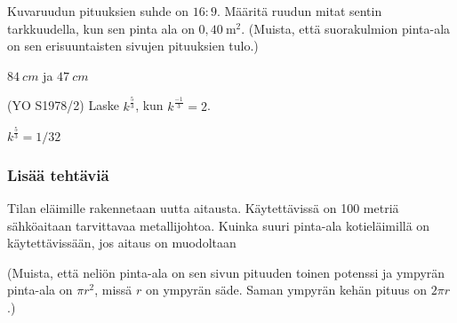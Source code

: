 \begin{tehtavasivu}
\begin{tehtava}
Kuvaruudun pituuksien suhde on $16:9$. Määritä ruudun mitat sentin tarkkuudella, kun sen pinta ala on \(0,40\ \mathrm{m}^2\). (Muista, että suorakulmion pinta-ala on sen erisuuntaisten sivujen pituuksien tulo.)
\begin{vastaus}
$84\ cm$ ja $47\ cm$
\end{vastaus}
\end{tehtava}

\begin{tehtava}
(YO S1978/2) Laske $k^\frac{5}{3}$, kun $k^\frac{-1}{3}=2$. \\
	\begin{vastaus}
		$k^\frac{5}{3}=1/32$
	\end{vastaus}
\end{tehtava}

\subsubsection*{Lisää tehtäviä}

\begin{tehtava}%
Tilan eläimille rakennetaan uutta aitausta. Käytettävissä on 100 metriä sähköaitaan tarvittavaa metallijohtoa. Kuinka suuri pinta-ala kotieläimillä on käytettävissään, jos aitaus on muodoltaan
\begin{alakohdat}
\end{alakohdat}
(Muista, että neliön pinta-ala on sen sivun pituuden toinen potenssi ja ympyrän pinta-ala on \(\pi r^2\), missä \(r\) on ympyrän säde. Saman ympyrän kehän pituus on \(2\pi r\).)
\begin{vastaus}
\begin{alakohdat}
\end{alakohdat}
\end{vastaus}
\end{tehtava}


\end{tehtavasivu}
